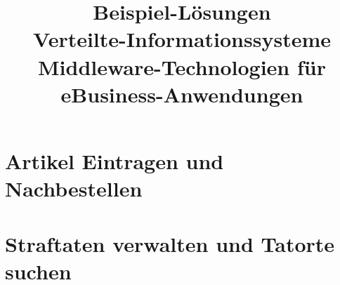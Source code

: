 \documentclass[a4paper, 10pt]{article}
\title{Beispiel-Lösungen\\Verteilte-Informationssysteme\\Middleware-Technologien für eBusiness-Anwendungen}
\begin{document}
\maketitle
\begin{multicols}{2}

\end{multicols}

\section*{Artikel Eintragen und Nachbestellen}
    
    
    
    
    

\section*{Straftaten verwalten und Tatorte suchen}
    
    
    
    
    
\end{document}
